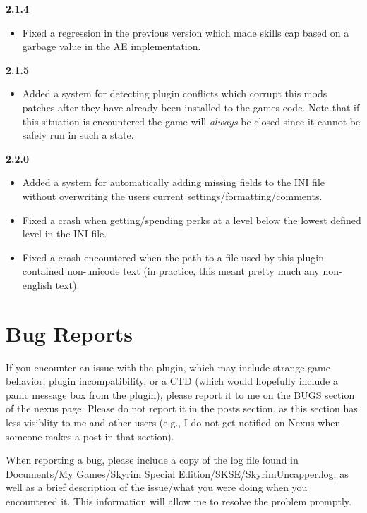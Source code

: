 \documentclass[12pt]{amsart}
\begin{document}
\startblock
\noindent
\textbf{2.1.4}
\begin{itemize}
    \item Fixed a regression in the previous version which made skills cap based
          on a garbage value in the AE implementation.
\end{itemize}
\stopblock

\startblock
\noindent
\textbf{2.1.5}
\begin{itemize}
    \item Added a system for detecting plugin conflicts which corrupt this mods
          patches after they have already been installed to the games code. Note
          that if this situation is encountered the game will \emph{always} be
          closed since it cannot be safely run in such a state.
\end{itemize}
\stopblock

\startblock
\noindent
\textbf{2.2.0}
\begin{itemize}
    \item Added a system for automatically adding missing fields to the INI file
          without overwriting the users current settings/formatting/comments.
    \item Fixed a crash when getting/spending perks at a level below the lowest
          defined level in the INI file.
    \item Fixed a crash encountered when the path to a file used by this plugin
          contained non-unicode text (in practice, this meant pretty much any
          non-english text).
\end{itemize}
\stopblock

\startblock
\section{Bug Reports}

If you encounter an issue with the plugin, which may include strange game
behavior, plugin incompatibility, or a CTD (which would hopefully include
a panic message box from the plugin), please report it to me on the BUGS
section of the nexus page. Please do not report it in the posts section, as
this section has less visiblity to me and other users (e.g., I do not get
notified on Nexus when someone makes a post in that section).

When reporting a bug, please include a copy of the log file found in
\textlangle Documents\textrangle/My Games/Skyrim Special Edition/SKSE/SkyrimUncapper.log,
as well as a brief description of the issue/what you were doing when you
encountered it. This information will allow me to resolve the problem promptly.
\stopblock
\end{document}
